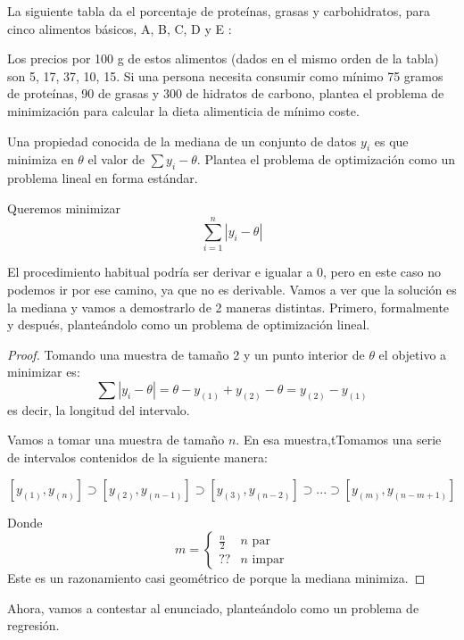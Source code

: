 \begin{problem}[3]

La siguiente tabla da el porcentaje de proteínas, grasas y carbohidratos, para cinco alimentos
básicos, A, B, C, D y E :


Los precios por 100 g de estos alimentos (dados en el mismo orden de la tabla) son 5, 17, 37, 10,
15. Si una persona necesita consumir como mínimo 75 gramos de proteínas, 90 de grasas y 300 de
hidratos de carbono, plantea el problema de minimización para calcular la dieta alimenticia de mínimo coste.
\solution


\end{problem}


\begin{problem}[9]

Una propiedad conocida de la mediana de un conjunto de datos $y_i$ es que minimiza en $\theta$ el valor de $\sum y_i-\theta$. Plantea el problema de optimización como un problema lineal en forma estándar.
\solution

Queremos minimizar 
\[\sum_{i=1}^n |y_i - \theta|\]

El procedimiento habitual podría ser derivar e igualar a 0, pero en este caso no podemos ir por ese camino, ya que no es derivable.
Vamos a ver que la solución es la mediana y vamos a demostrarlo de 2 maneras distintas. 
Primero, formalmente y después, planteándolo como un problema de optimización lineal.

\begin{proof}

Tomando una muestra de tamaño 2 y un punto interior de $\theta$ el objetivo a minimizar es:
\[\sum |y_i - \theta| = \theta - y_{(1)} + y_{(2)}-\theta = y_{(2)} - y_{(1)}\]
es decir, la longitud del intervalo.

Vamos a tomar una muestra de tamaño $n$. 
En esa muestra,tTomamos una serie de intervalos contenidos de la siguiente manera:

\[ [y_{(1)},y_{(n)}] \supset  [y_{(2)},y_{(n-1)}] \supset [y_{(3)},y_{(n-2)}] \supset ... \supset [y_{(m)},y_{(n-m+1)}]\]

Donde \[m=\left\{ \begin{array}{cc} \frac{n}{2} & n\text{ par}\\ ?? & n\text{ impar} \end{array}\right.\]
Este es un razonamiento casi geométrico de porque la mediana minimiza.
\end{proof}


Ahora, vamos a contestar al enunciado, planteándolo como un problema de regresión.


\end{problem}
